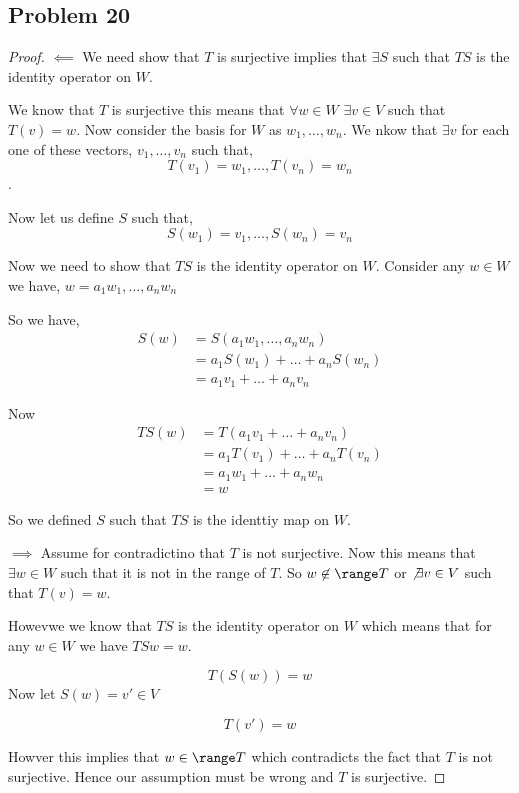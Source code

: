 \documentclass[a4paper]{report}
\begin{document}
\subsection*{Problem 20}
\begin{proof}
    $\impliedby$ 
    We need show that $T$ is surjective implies that $\exists S$ such that $TS$ is the identity operator on $W$.

    We know that  $T$ is surjective this means that $\forall w \in W$ $\exists v \in V$ such that $T(v) = w$. Now consider the basis for  $W$ as $w_1,\dots,w_n$. We nkow that $\exists v$ for each one of these vectors, $v_1,\dots,v_n$ such that, 
    $$ T(v_1) = w_1,\dots,T(v_n) = w_n $$.

    Now let us define $S$ such that, 
    $$ S(w_1) = v_1,\dots,S(w_n) = v_n $$ 

    Now we need to show that $TS$ is the identity operator on $W$. Consider any $w \in W$ we have, $w = a_1w_1,\dots,a_nw_n$

    So we have, 
    \begin{align*}
        S(w) &= S(a_1w_1,\dots,a_nw_n)\\
             &= a_1S(w_1) + \dots + a_nS(w_n)\\
             &= a_1v_1+ \dots + a_nv_n
    \end{align*}

    Now 
    \begin{align*}
        TS(w) &= T(a_1v_1+\dots+a_nv_n) \\
              &= a_1T(v_1) + \dots + a_nT(v_n)\\
              &= a_1w_1 + \dots + a_nw_n\\
        &= w
    \end{align*}

    So we defined $S$ such that $TS$ is the identtiy map on $W$.


    $\implies$ 
    Assume for contradictino that $T$ is not surjective. Now this means that $\exists w \in W$ such that it is not in the range of $T$. So $w \not \in \range T$ or  $\not \exists v \in V $ such that $T(v) = w$. 

    Howevwe we know that  $TS$ is the identity operator on $W$ which means that for any $w \in W$ we have $TSw = w$.

    
    $$ T(S(w)) = w $$  
    Now let $S(w) = v' \in V$

    $$ T(v') = w $$ 

    Howver this implies that $w \in \range T$ which contradicts the fact that $ T$ is not surjective. Hence our assumption must be wrong and $T$ is surjective.
\end{proof}
\end{document}
